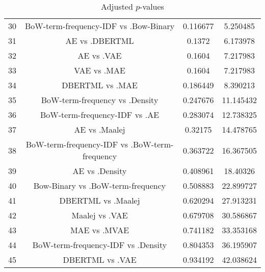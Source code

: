 \documentclass[a4paper,10pt]{article}
\begin{document}
\begin{landscape}
\begin{table}[!htp]
\begin{tabular}{cccc}
30&BoW-term-frequency-IDF vs .Bow-Binary&0.116677&5.250485\\
31&AE vs .DBERTML&0.1372&6.173978\\
32&AE vs .VAE&0.1604&7.217983\\
33&VAE vs .MAE&0.1604&7.217983\\
34&DBERTML vs .MAE&0.186449&8.390213\\
35&BoW-term-frequency vs .Density&0.247676&11.145432\\
36&BoW-term-frequency-IDF vs .AE&0.283074&12.738325\\
37&AE vs .Maalej&0.32175&14.478765\\
38&BoW-term-frequency-IDF vs .BoW-term-frequency&0.363722&16.367505\\
39&AE vs .Density&0.408961&18.40326\\
40&Bow-Binary vs .BoW-term-frequency&0.508883&22.899727\\
41&DBERTML vs .Maalej&0.620294&27.913231\\
42&Maalej vs .VAE&0.679708&30.586867\\
43&MAE vs .MVAE&0.741182&33.353168\\
44&BoW-term-frequency-IDF vs .Density&0.804353&36.195907\\
45&DBERTML vs .VAE&0.934192&42.038624\\
\hline
\end{tabular}
\caption{Adjusted $p$-values}
\end{table}

\end{landscape}
\end{document}
